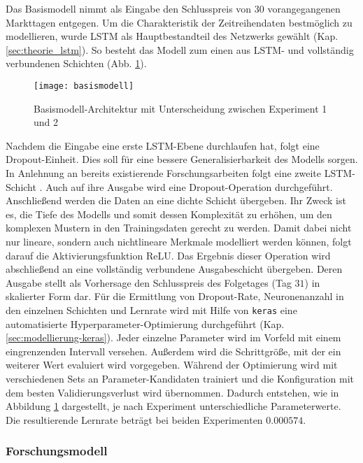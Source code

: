 Das Basismodell nimmt als Eingabe den Schlusspreis von $30$ vorangegangenen Markttagen entgegen. Um die Charakteristik der Zeitreihendaten bestmöglich zu modellieren, wurde \ac{LSTM} als Hauptbestandteil des Netzwerks gewählt (Kap. \ref{sec:theorie_lstm}). So besteht das Modell zum einen aus \ac{LSTM}- und vollständig verbundenen Schichten (Abb. \ref{fig:basismodell}). 
\begin{figure}[H]
	\centering
	\texttt{[image: basismodell]}
	\caption{Basismodell-Architektur mit Unterscheidung zwischen Experiment 1 und 2}
	\label{fig:basismodell}
\end{figure}
Nachdem die Eingabe eine erste \ac{LSTM}-Ebene durchlaufen hat, folgt eine Dropout-Einheit. Dies soll für eine bessere Generalisierbarkeit des Modells sorgen. In Anlehnung an bereits existierende Forschungsarbeiten folgt eine zweite \ac{LSTM}-Schicht \autocite[Kap. 4.2.1]{guan2020stockprice}. Auch auf ihre Ausgabe wird eine Dropout-Operation durchgeführt. Anschließend werden die Daten an eine dichte Schicht übergeben. Ihr Zweck ist es, die Tiefe des Modells und somit dessen Komplexität zu erhöhen, um den komplexen Mustern in den Trainingsdaten gerecht zu werden. Damit dabei nicht nur lineare, sondern auch nichtlineare Merkmale modelliert werden können, folgt darauf die Aktivierungsfunktion \ac{ReLU}. Das Ergebnis dieser Operation wird abschließend an eine vollständig verbundene Ausgabeschicht übergeben. Deren Ausgabe stellt als Vorhersage den Schlusspreis des Folgetages (Tag $31$) in skalierter Form dar.
Für die Ermittlung von Dropout-Rate, Neuronenanzahl in den einzelnen Schichten und Lernrate wird mit Hilfe von \texttt{keras} eine automatisierte Hyperparameter-Optimierung durchgeführt (Kap. \ref{sec:modellierung-keras}). Jeder einzelne Parameter wird im Vorfeld mit einem eingrenzenden Intervall versehen. Außerdem wird die Schrittgröße, mit der ein weiterer Wert evaluiert wird vorgegeben. Während der Optimierung wird mit verschiedenen Sets an Parameter-Kandidaten trainiert und die Konfiguration mit dem besten Validierungsverlust wird übernommen. Dadurch entstehen, wie in Abbildung \ref{fig:basismodell} dargestellt, je nach Experiment unterschiedliche Parameterwerte. Die resultierende Lernrate beträgt bei beiden Experimenten $0.000574$.



\subsubsection{Forschungsmodell}\label{sec:modellierung_forsch}

